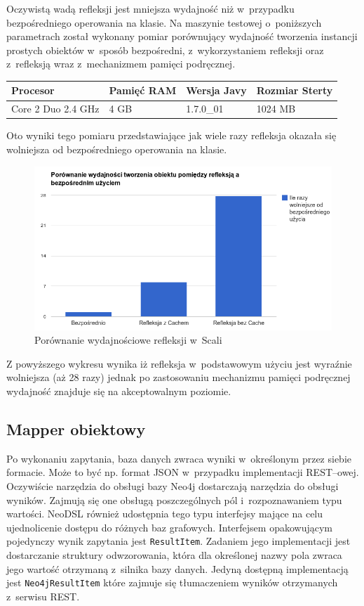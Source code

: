\documentclass[brudnopis]{xmgr}
\begin{document}
Oczywistą wadą refleksji jest mniejsza wydajność niż w~przypadku bezpośredniego operowania na klasie. Na maszynie testowej o~poniższych parametrach został wykonany pomiar porównujący wydajność tworzenia instancji prostych obiektów w~sposób bezpośredni, z~wykorzystaniem refleksji oraz z~refleksją wraz z~mechanizmem pamięci podręcznej.

\begin{tabular}{|l|l|l|l|}
  \hline 
  \textbf{Procesor} & \textbf{Pamięć RAM} & \textbf{Wersja Javy} & \textbf{Rozmiar Sterty} \\
  \hline
  Core 2 Duo 2.4 GHz & 4 GB & 1.7.0\_01 & 1024 MB \\
  \hline
\end{tabular} 

Oto wyniki tego pomiaru przedstawiające jak wiele razy refleksja okazała się wolniejsza od bezpośredniego operowania na klasie.

\begin{figure}[H]
	\includegraphics[scale=0.6]{images/reflection-comparison.png}
	\caption{Porównanie wydajnościowe refleksji w~Scali}
	\label{fig:reflection_comparison}
\end{figure}

Z powyższego wykresu wynika iż refleksja w~podstawowym użyciu jest wyraźnie wolniejsza (aż 28 razy) jednak po zastosowaniu mechanizmu pamięci podręcznej wydajność znajduje się na akceptowalnym poziomie.

\subsection{Mapper obiektowy}

Po wykonaniu zapytania, baza danych zwraca wyniki w~określonym przez siebie formacie. Może to być np. format JSON w~przypadku implementacji REST--owej. Oczywiście narzędzia do obsługi bazy Neo4j dostarczają narzędzia do obsługi wyników. Zajmują się one obsługą poszczególnych pól i~rozpoznawaniem typu wartości. NeoDSL również udostępnia tego typu interfejsy mające na celu ujednolicenie dostępu do różnych baz grafowych. Interfejsem opakowującym pojedynczy wynik zapytania jest \texttt{ResultItem}. Zadaniem jego implementacji jest dostarczanie struktury odwzorowania, która dla określonej nazwy pola zwraca jego wartość otrzymaną z~silnika bazy danych. Jedyną dostępną implementacją jest \texttt{Neo4jResultItem} które zajmuje się tłumaczeniem wyników otrzymanych z~serwisu REST.
\end{document}
